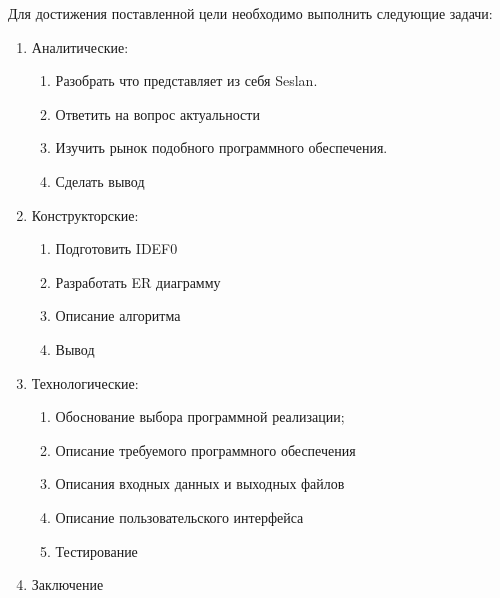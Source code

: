 	Для достижения поставленной цели необходимо выполнить следующие задачи:
	\begin{enumerate}
		\item Аналитические:
		\begin{enumerate}
			\item Разобрать что представляет из себя Seslan.
			\item Ответить на вопрос актуальности
			\item Изучить рынок подобного программного обеспечения.
			\item Сделать вывод
		\end{enumerate}
		
		\item Конструкторские:
		\begin{enumerate}
			\item Подготовить IDEF0
			\item Разработать ER диаграмму
			\item Описание алгоритма
			\item Вывод
		\end{enumerate}
		
		\item Технологические:
		\begin{enumerate}
			\item Обоснование выбора программной реализации;
			\item Описание требуемого программного обеспечения
			\item Описания входных данных и выходных файлов
			\item Описание пользовательского интерфейса
			\item Тестирование
		\end{enumerate}
		\item Заключение
	\end{enumerate}
